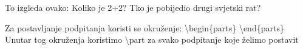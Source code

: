\documentclass{beamer}
\begin{document}
\begin{frame}
	To izgleda ovako:
	\newline
	\newline
	\question[1 bod]
	Koliko je 2+2?
	\newline
	\newline
	\question[3 boda]
	Tko je pobijedio drugi svjetski rat?
\end{frame}


\begin{frame}
Za postavljanje podpitanja koristi se okruženje:
\newline
\newline
\color{blue}
\textbackslash{begin\{parts\}}
\color{black}
\newline
\newline
\color{blue}
\textbackslash{end\{parts\}}
\color{black}
\newline
\newline
Unutar tog okruženja koristimo
\newline
\newline
\color{blue}
\textbackslash{part}
\color{black}
\newline
\newline
za svako podpitanje koje želimo postavit
\end{frame}





%
%
%
%

\begin{frame}

\end{frame}

%
%	
%
%

\begin{frame}

\end{frame}
	

	
\end{document}
